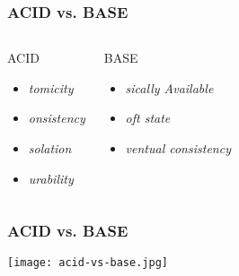 \begin{frame}
    \frametitle{ACID vs. BASE}

    \begin{columns}

        \begin{block}{ACID}
            \begin{itemize}
                \item \textit{tomicity}
                \item \textit{onsistency}
                \item \textit{solation}
                \item \textit{urability}
            \end{itemize}
        \end{block}


        \begin{block}{BASE}
            \begin{itemize}
                \item \textit{sically Available}
                \item \textit{oft state}
                \item \textit{ventual consistency}
            \end{itemize}
        \end{block}
    \end{columns}

\end{frame}

\begin{frame}
    \frametitle{ACID vs. BASE}

    \centering
    \texttt{[image: acid-vs-base.jpg]}
\end{frame}